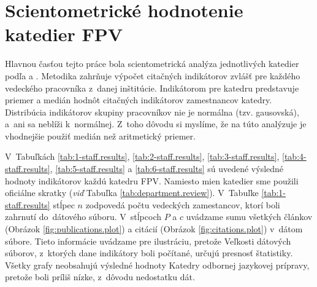 \section{Scientometrické hodnotenie katedier FPV}

Hlavnou časťou tejto práce bola scientometrická analýza jednotlivých katedier
podľa \citet{Kazakis2014a} a \citet{Kazakis2014b,Kazakis2015}. Metodika zahrňuje
výpočet citačných indikátorov zvlášť pre každého vedeckého pracovníka z~danej
inštitúcie. Indikátorom pre katedru predstavuje priemer a medián hodnôt
citačných indikátorov zamestnancov katedry.  Distribúcia indikátorov skupiny
pracovníkov nie je normálna (tzv. gausovská), a~ani sa neblíži
k~normálnej. Z~toho dôvodu si myslíme, že na túto analýzuje je vhodnejšie použiť
medián než aritmetický priemer.

V~Tabuľkách \ref{tab:1-staff.results}, \ref{tab:2-staff.results},
\ref{tab:3-staff.results}, \ref{tab:4-staff.results}, \ref{tab:5-staff.results}
a \ref{tab:6-staff.results} sú uvedené výsledné hodnoty indikátorov každú
katedru FPV.  Namiesto mien katedier sme použili oficiálne skratky (\emph{viď}
Tabuľka \ref{tab:department.review}).  V~Tabuľke \ref{tab:1-staff.results}
stĺpec $n$ zodpovedá počtu vedeckých zamestancov, ktorí boli zahrnutí
do~dátového súboru.  V~stĺpcoch $P$ a $c$ uvádzame sumu všetkých článkov
(Obrázok \ref{fig:publications.plot}) a citácií (Obrázok
\ref{fig:citations.plot}) v~dátom súbore.  Tieto informácie uvádzame pre
ilustráciu, pretože Veľkosti dátových súborov, z~ktorých dane indikátory boli
počítané, určujú presnosť štatistiky. Všetky grafy neobsahujú výsledné hodnoty
Katedry odbornej jazykovej prípravy, pretože boli príliš nízke, z~dôvodu
nedostatku dát.


